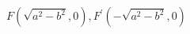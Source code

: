 \documentclass[preview]{standalone}
\begin{document}
\begin{align*}
F(\sqrt{a^2-b^2}, 0), F^\prime(-\sqrt{a^2-b^2}, 0)
\end{align*}
\end{document}
